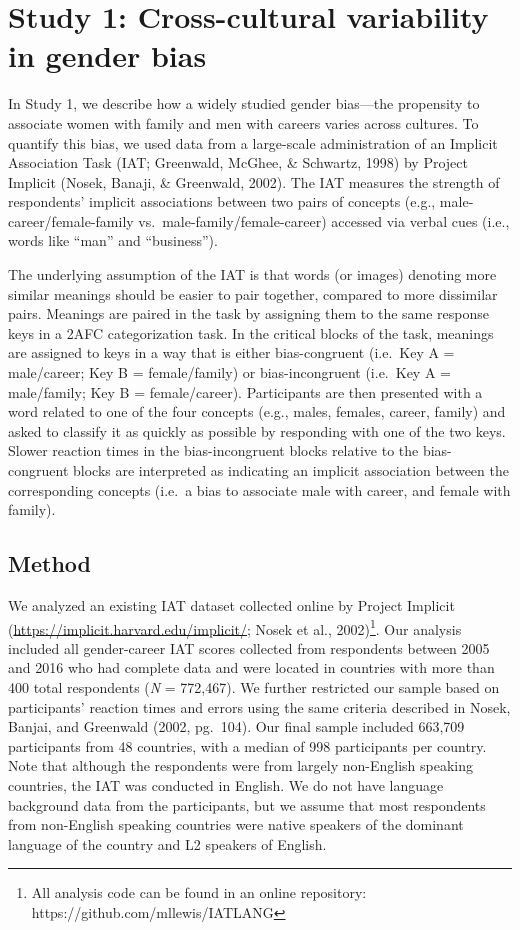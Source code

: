 \documentclass[10pt, letterpaper]{article}
\begin{document}
\section{Study 1: Cross-cultural variability in gender
bias}\label{study-1-cross-cultural-variability-in-gender-bias}

In Study 1, we describe how a widely studied gender bias---the
propensity to associate women with family and men with careers varies
across cultures. To quantify this bias, we used data from a large-scale
administration of an Implicit Association Task (IAT; Greenwald, McGhee,
\& Schwartz, 1998) by Project Implicit (Nosek, Banaji, \& Greenwald,
2002). The IAT measures the strength of respondents' implicit
associations between two pairs of concepts (e.g.,
male-career/female-family vs.~male-family/female-career) accessed via
verbal cues (i.e., words like ``man'' and ``business'').

The underlying assumption of the IAT is that words (or images) denoting
more similar meanings should be easier to pair together, compared to
more dissimilar pairs. Meanings are paired in the task by assigning them
to the same response keys in a 2AFC categorization task. In the critical
blocks of the task, meanings are assigned to keys in a way that is
either bias-congruent (i.e.~Key A = male/career; Key B = female/family)
or bias-incongruent (i.e.~Key A = male/family; Key B = female/career).
Participants are then presented with a word related to one of the four
concepts (e.g., males, females, career, family) and asked to classify it
as quickly as possible by responding with one of the two keys. Slower
reaction times in the bias-incongruent blocks relative to the
bias-congruent blocks are interpreted as indicating an implicit
association between the corresponding concepts (i.e.~a bias to associate
male with career, and female with family).

\subsection{Method}\label{method}

We analyzed an existing IAT dataset collected online by Project Implicit
(\url{https://implicit.harvard.edu/implicit/}; Nosek et al.,
2002)\footnote{All analysis code can be found in an online repository: https://github.com/mllewis/IATLANG}.
Our analysis included all gender-career IAT scores collected from
respondents between 2005 and 2016 who had complete data and were located
in countries with more than 400 total respondents (\emph{N} = 772,467).
We further restricted our sample based on participants' reaction times
and errors using the same criteria described in Nosek, Banjai, and
Greenwald (2002, pg.~104). Our final sample included 663,709
participants from 48 countries, with a median of 998 participants per
country. Note that although the respondents were from largely
non-English speaking countries, the IAT was conducted in English. We do
not have language background data from the participants, but we assume
that most respondents from non-English speaking countries were native
speakers of the dominant language of the country and L2 speakers of
English.
\end{document}
